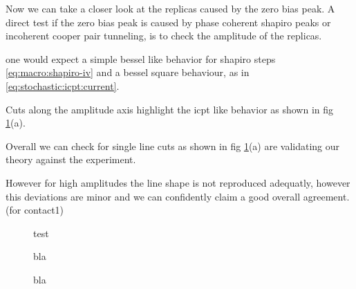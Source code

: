         Now we can take a closer look at the replicas caused by the zero bias peak. A direct test if the zero bias peak is caused by phase coherent shapiro peaks or incoherent cooper pair tunneling, is to check the amplitude of the replicas.

        one would expect a simple bessel like behavior for shapiro steps \ref{eq:macro:shapiro-iv} and a bessel square behaviour, as in \ref{eq:stochastic:icpt:current}.

        Cuts along the amplitude axis highlight the icpt like behavior as shown in fig \ref{fig:ac:contact1:didv-cuts}(a).

        Overall we can check for single line cuts as shown in fig \ref{fig:ac:contact1:didv-cuts}(a) are validating our theory against the experiment.

        However for high amplitudes the line shape is not reproduced adequatly, however this deviations are minor and we can confidently claim a good overall agreement. (for contact1)

        \begin{figure}[t]
            \centering
            \caption{
                test
            }
            \label{fig:ac:contact1:didv-cuts}
        \end{figure}



        \begin{figure}[t]
            \centering
            \hfill
            \caption{
                bla
            }
            \label{fig:ac:contact2:comparison}
        \end{figure}

        \begin{figure}[t]
            \centering
            \hfill
            \caption{
                bla
            }
            \label{fig:ac:contact1:comparison}
        \end{figure}

